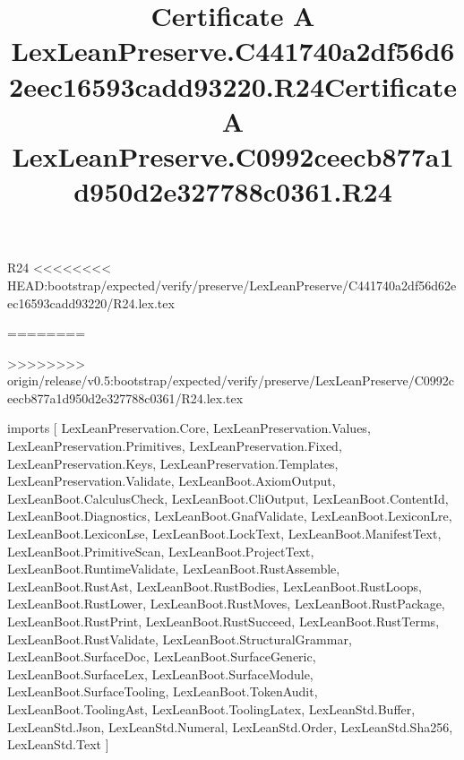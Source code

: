 \begin{lexlean}{R24}
<<<<<<<< HEAD:bootstrap/expected/verify/preserve/LexLeanPreserve/C441740a2df56d62eec16593cadd93220/R24.lex.tex
\title{Certificate A LexLeanPreserve.C441740a2df56d62eec16593cadd93220.R24}
========
\title{Certificate A LexLeanPreserve.C0992ceecb877a1d950d2e327788c0361.R24}
>>>>>>>> origin/release/v0.5:bootstrap/expected/verify/preserve/LexLeanPreserve/C0992ceecb877a1d950d2e327788c0361/R24.lex.tex
\begin{coremodule}
imports [
  LexLeanPreservation.Core,
  LexLeanPreservation.Values,
  LexLeanPreservation.Primitives,
  LexLeanPreservation.Fixed,
  LexLeanPreservation.Keys,
  LexLeanPreservation.Templates,
  LexLeanPreservation.Validate,
  LexLeanBoot.AxiomOutput,
  LexLeanBoot.CalculusCheck,
  LexLeanBoot.CliOutput,
  LexLeanBoot.ContentId,
  LexLeanBoot.Diagnostics,
  LexLeanBoot.GnafValidate,
  LexLeanBoot.LexiconLre,
  LexLeanBoot.LexiconLse,
  LexLeanBoot.LockText,
  LexLeanBoot.ManifestText,
  LexLeanBoot.PrimitiveScan,
  LexLeanBoot.ProjectText,
  LexLeanBoot.RuntimeValidate,
  LexLeanBoot.RustAssemble,
  LexLeanBoot.RustAst,
  LexLeanBoot.RustBodies,
  LexLeanBoot.RustLoops,
  LexLeanBoot.RustLower,
  LexLeanBoot.RustMoves,
  LexLeanBoot.RustPackage,
  LexLeanBoot.RustPrint,
  LexLeanBoot.RustSucceed,
  LexLeanBoot.RustTerms,
  LexLeanBoot.RustValidate,
  LexLeanBoot.StructuralGrammar,
  LexLeanBoot.SurfaceDoc,
  LexLeanBoot.SurfaceGeneric,
  LexLeanBoot.SurfaceLex,
  LexLeanBoot.SurfaceModule,
  LexLeanBoot.SurfaceTooling,
  LexLeanBoot.TokenAudit,
  LexLeanBoot.ToolingAst,
  LexLeanBoot.ToolingLatex,
  LexLeanStd.Buffer,
  LexLeanStd.Json,
  LexLeanStd.Numeral,
  LexLeanStd.Order,
  LexLeanStd.Sha256,
  LexLeanStd.Text
]


\end{coremodule}
\end{lexlean}
